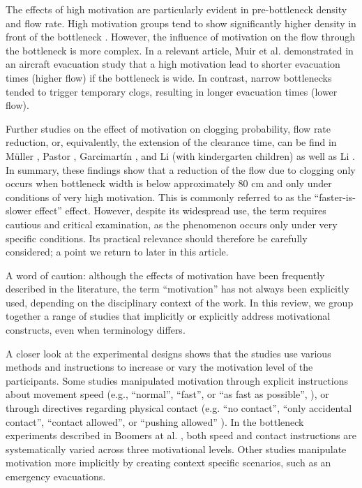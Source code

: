 \documentclass[pdflatex,sn-mathphys-num]{sn-jnl}%
\theoremstyle{thmstyleone}%
\theoremstyle{thmstyletwo}%
\theoremstyle{thmstylethree}%
\begin{document}
The effects of high motivation are particularly evident in pre-bottleneck density and flow rate. High motivation groups tend to show significantly higher density in front of the bottleneck \cite{sieben_collective_2017, adrian_crowds_2020, li_bottleneck_2021}. However, the influence of motivation on the flow through the bottleneck is more complex. In a relevant article, Muir et al. \cite{muir_effects_1996} demonstrated in an aircraft evacuation study that a high motivation lead to shorter evacuation times (higher flow) if the bottleneck is wide. In contrast, narrow bottlenecks tended to trigger temporary clogs, resulting in longer evacuation times (lower flow). 

Further studies on the effect of motivation on clogging probability, flow rate reduction, or, equivalently, the extension of the clearance time, can be find in Müller \cite{muller_fluchtwegen_1981}, %
Pastor \cite{pastor_experimental_2015}, Garcimartín \cite{garcimartin_flow_2016}, and Li (with kindergarten children) \cite{li_bottleneck_2020} as well as Li \cite{li_motivation_2024}. In summary, these findings show that a reduction of the flow due to clogging only occurs when bottleneck width is below approximately 80 cm and only under conditions of very high motivation. This is commonly referred to as the “faster-is-slower effect” effect. However, despite its widespread use, the term requires cautious and critical examination, as the phenomenon occurs only under very specific conditions. Its practical relevance should therefore be carefully considered; a point we return to later in this article.

A word of caution: although the effects of motivation have been frequently described in the literature, the term “motivation” has not always been explicitly used, depending on the disciplinary context of the work. In this review, we group together a range of studies that implicitly or explicitly address motivational constructs, even when terminology differs.

A closer look at the experimental designs shows that the studies use various methods and instructions to increase or vary the motivation level of the participants. Some studies manipulated motivation through explicit instructions about movement speed (e.g., “normal”, “fast”, or “as fast as possible”, \cite{peschl_passage_1971, muller_fluchtwegen_1981}), or through directives regarding physical contact (e.g. “no contact”, “only accidental contact”, “contact allowed”, or “pushing allowed”%
). In the bottleneck experiments described in Boomers at al. \cite{boomers_crowd_2023}, both speed and contact instructions are systematically varied across three motivational levels. Other studies manipulate motivation more implicitly by creating context specific scenarios, such as an emergency evacuations.
\end{document}
